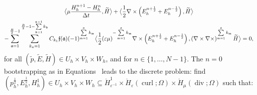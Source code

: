 \documentclass{amsart}
\theoremstyle{thmstyleone}%
\theoremstyle{thmstyletwo}%
\theoremstyle{thmstylethree}%
\DeclareMathOperator{\curl}{curl}
\def\divgn{\operatorname{div}}
\newcommand{\aInnerproduct}[2]{\bigl\langle #1, #2 \bigr\rangle}
\begin{document}
\begin{subequations}
\begin{multline}
     \end{multline} \\
      \begin{multline}
  \aInnerproduct{\mu \dfrac{H_h^{n + 1} - H_h^n}{\Delta t}}{\widetilde{H}} +  \aInnerproduct{\dfrac{1}{2} \nabla \times \left( E_h^{n + \frac{1}{2}} + E_h^{n - \frac{1}{2}} \right)}{\widetilde{H}} \\ - \sum\limits_{\mathfrak{a} = 1}^{\frac{R}{2} - 1} \sum\limits_{k_\mathfrak{a} = 1}^{\frac{R}{2} - 1 - \sum\limits_{\mathfrak{b} = 1}^{\mathfrak{a} - 1} k_\mathfrak{b}} C_{k_1} \mathfrak{f}(\mathfrak{a}) (-1)^{\sum\limits_{\mathfrak{m} = 1}^\mathfrak{a} k_\mathfrak{m}} \aInnerproduct{\dfrac{1}{2} (\varepsilon \mu)^{-\sum\limits_{\mathfrak{m} = 1}^\mathfrak{a} k_\mathfrak{m}} \nabla \times \left( E_h^{n + \frac{1}{2}} + E_h^{n - \frac{1}{2}} \right)}{\left( \nabla \times  \nabla \times \right)^{\sum\limits_{\mathfrak{m} = 1}^\mathfrak{a} k_\mathfrak{m}} \widetilde{H}} = 0, \label{eqn:maxwell_H_lfR_full}
       \end{multline}
\end{subequations}
for all $(\widetilde{p}, \widetilde{E}, \widetilde{H}) \in U_h \times V_h \times W_h$, and for $n \in \{1, \dotso, N - 1\}$. 
The $n = 0$ bootstrapping as in Equations~ leads to the discrete problem: find $(p_h^{\frac{1}{2}}, E_h^{\frac{1}{2}}, H_h^1) \in U_h \times V_h \times W_h \subseteq \mathring{H}_{\varepsilon^{-1}}^1 \times \mathring{H}_{\varepsilon}(\curl; \Omega) \times \mathring{H}_{\mu}(\divgn; \Omega)$ such that:
\end{document}
